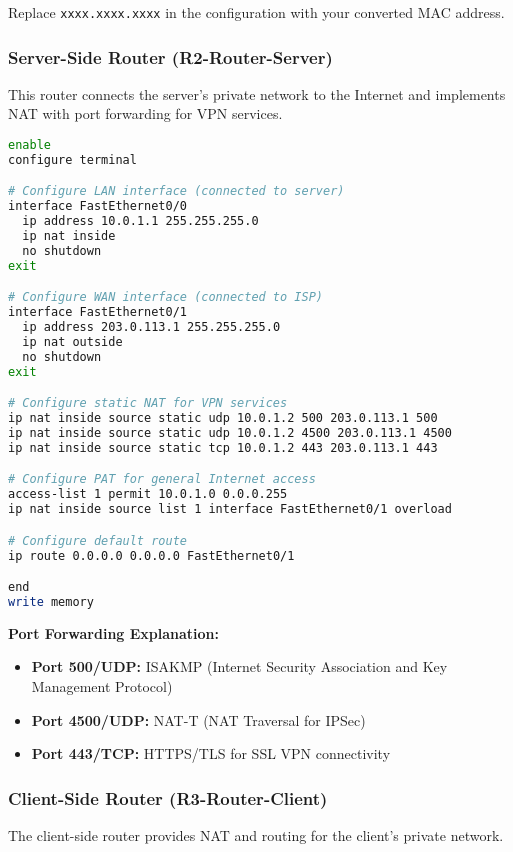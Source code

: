 Replace \texttt{xxxx.xxxx.xxxx} in the configuration with your converted MAC address.

\subsubsection{Server-Side Router (R2-Router-Server)}

This router connects the server's private network to the Internet and implements NAT with port forwarding for VPN services.

\begin{lstlisting}[language=bash]
enable
configure terminal

# Configure LAN interface (connected to server)
interface FastEthernet0/0
  ip address 10.0.1.1 255.255.255.0
  ip nat inside
  no shutdown
exit

# Configure WAN interface (connected to ISP)
interface FastEthernet0/1
  ip address 203.0.113.1 255.255.255.0
  ip nat outside
  no shutdown
exit

# Configure static NAT for VPN services
ip nat inside source static udp 10.0.1.2 500 203.0.113.1 500
ip nat inside source static udp 10.0.1.2 4500 203.0.113.1 4500
ip nat inside source static tcp 10.0.1.2 443 203.0.113.1 443

# Configure PAT for general Internet access
access-list 1 permit 10.0.1.0 0.0.0.255
ip nat inside source list 1 interface FastEthernet0/1 overload

# Configure default route
ip route 0.0.0.0 0.0.0.0 FastEthernet0/1

end
write memory
\end{lstlisting}

\textbf{Port Forwarding Explanation:}
\begin{itemize}
    \item \textbf{Port 500/UDP:} ISAKMP (Internet Security Association and Key Management Protocol)
    \item \textbf{Port 4500/UDP:} NAT-T (NAT Traversal for IPSec)
    \item \textbf{Port 443/TCP:} HTTPS/TLS for SSL VPN connectivity
\end{itemize}

\subsubsection{Client-Side Router (R3-Router-Client)}

The client-side router provides NAT and routing for the client's private network.

